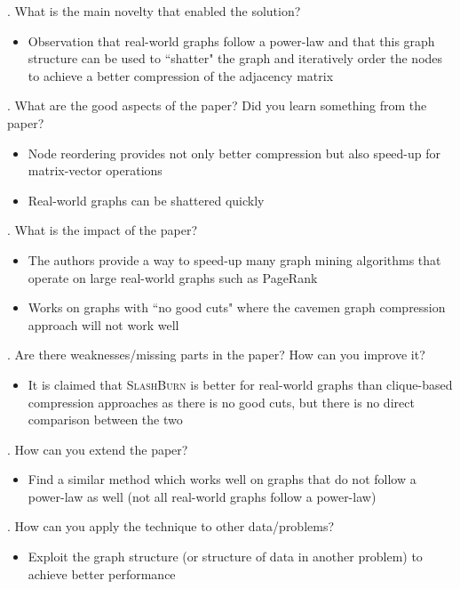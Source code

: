 \documentclass[12pt]{article}
\begin{document}
. What is the main novelty that enabled the solution?

\begin{itemize}
    \item Observation that real-world graphs follow a power-law and that this graph structure can be used to ``shatter" the graph and iteratively order the nodes to achieve a better compression of the adjacency matrix
\end{itemize}

. What are the good aspects of the paper? Did you learn something from the paper?

\begin{itemize}
    \item Node reordering provides not only better compression but also speed-up for matrix-vector operations
    \item Real-world graphs can be shattered quickly
\end{itemize}

. What is the impact of the paper?

\begin{itemize}
    \item The authors provide a way to speed-up many graph mining algorithms that operate on large real-world graphs such as PageRank
    \item Works on graphs with ``no good cuts" where the cavemen graph compression approach will not work well
\end{itemize}

. Are there weaknesses/missing parts in the paper? How can you improve it?

\begin{itemize}
    \item It is claimed that \textsc{SlashBurn} is better for real-world graphs than clique-based compression approaches as there is no good cuts, but there is no direct comparison between the two
\end{itemize}

. How can you extend the paper?

\begin{itemize}
    \item Find a similar method which works well on graphs that do not follow a power-law as well (not all real-world graphs follow a power-law)
\end{itemize}

. How can you apply the technique to other data/problems?

\begin{itemize}
    \item Exploit the graph structure (or structure of data in another problem) to achieve better performance
\end{itemize}
\end{document}
